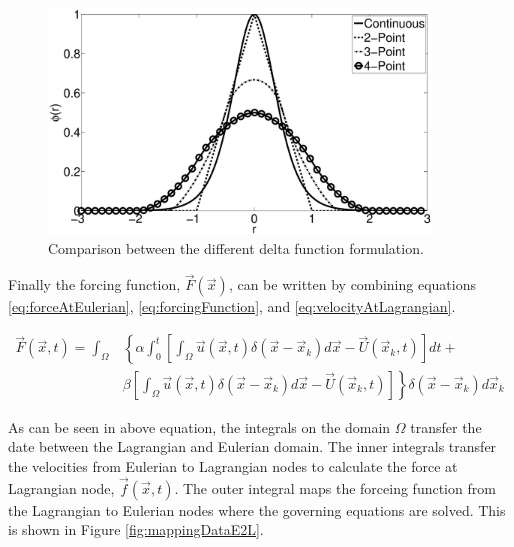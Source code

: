 \documentclass[12pt]{aiaa-pretty}
\begin{document}
%
\begin{figure}
	\centering
	\includegraphics[height=6.0cm]{figure/heaviside_comparison.eps}
	\caption{Comparison between the different delta function formulation.}
	\label{fig:heavisideComparison}
\end{figure}
%

Finally the forcing function, $\vec{F}(\vec{x})$, can be written by combining equations \eqref{eq:forceAtEulerian}, \eqref{eq:forcingFunction}, and \eqref{eq:velocityAtLagrangian}.

%
\begin{equation}
\begin{aligned}\label{eq:forceAtEulerianFinal}
	\vec{F}(\vec{x}, t) = 
	\int_\Omega 
	&\left\{
 	\alpha \int_0^t
	\left[
	\int_\Omega \vec{u} (\vec{x}, t) \delta(\vec{x} - \vec{x}_k) d\vec{x} - \vec{U}\left( \vec{x}_k, t \right)
	\right]dt + \right. \\
	&\left.
	\beta \left[
	\int_\Omega \vec{u} (\vec{x}, t) \delta(\vec{x} - \vec{x}_k) d\vec{x} - \vec{U}\left( \vec{x}_k, t \right)
	\right]
	\right\} \delta(\vec{x} - \vec{x}_k) d\vec{x}_k
\end{aligned}
\end{equation}
%

As can be seen in above equation, the integrals on the domain $\Omega$ transfer the date between the Lagrangian and Eulerian domain. The inner integrals transfer the velocities from Eulerian to Lagrangian nodes to calculate the force at Lagrangian node, $\vec{f}\left( \vec{x}, t \right)$. The outer integral maps the forceing function from the Lagrangian to Eulerian nodes where the governing equations are solved. This is shown in Figure \ref{fig:mappingDataE2L}.
\end{document}

